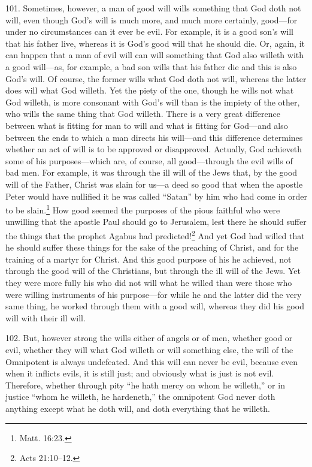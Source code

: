 101. Sometimes, however, a man of good will wills something that God doth not will, even though God's will is much more, and much more certainly, good—for under no circumstances can it ever be evil. For example, it is a good son's will that his father live, whereas it is God's good will that he should die. Or, again, it can happen that a man of evil will can will something that God also willeth with a good will—as, for example, a bad son wills that his father die and this is also God's will. Of course, the former wills what God doth not will, whereas the latter does will what God willeth. Yet the piety of the one, though he wills not what God willeth, is more consonant with God's will than is the impiety of the other, who wills the same thing that God willeth. There is a very great difference between what is fitting for man to will and what is fitting for God—and also between the ends to which a man directs his will—and this difference determines whether an act of will is to be approved or disapproved. Actually, God achieveth some of his purposes—which are, of course, all good—through the evil wills of bad men. For example, it was through the ill will of the Jews that, by the good will of the Father, Christ was slain for us—a deed so good that when the apostle Peter would have nullified it he was called ``Satan'' by him who had come in order to be slain.\footnote{Matt. 16:23.} How good seemed the purposes of the pious faithful who were unwilling that the apostle Paul should go to Jerusalem, lest there he should suffer the things that the prophet Agabus had predicted!\footnote{Acts 21:10–12.} And yet God had willed that he should suffer these things for the sake of the preaching of Christ, and for the training of a martyr for Christ. And this good purpose of his he achieved, not through the good will of the Christians, but through the ill will of the Jews. Yet they were more fully his who did not will what he willed than were those who were willing instruments of his purpose—for while he and the latter did the very same thing, he worked through them with a good will, whereas they did his good will with their ill will.

102. But, however strong the wills either of angels or of men, whether good or evil, whether they will what God willeth or will something else, the will of the Omnipotent is always undefeated. And this will can never be evil, because even when it inflicts evils, it is still just; and obviously what is just is not evil. Therefore, whether through pity ``he hath mercy on whom he willeth,'' or in justice ``whom he willeth, he hardeneth,'' the omnipotent God never doth anything except what he doth will, and doth everything that he willeth.

